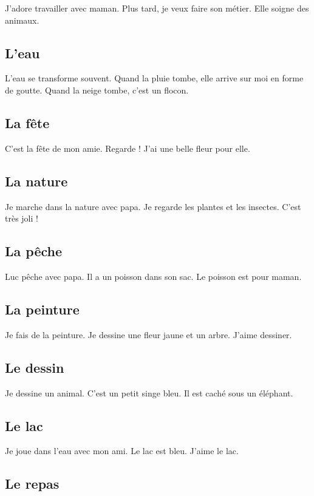 \documentclass[11pt, french]{article}
\begin{document}
J'adore travailler avec maman. Plus tard, je veux faire son métier. Elle soigne des animaux.

\subsection{L'eau}

L'eau se transforme souvent. Quand la pluie tombe, elle arrive sur moi en forme de goutte.
Quand la neige tombe, c'est un flocon.

\subsection{La fête}

C'est la fête de mon amie. Regarde ! J'ai une belle fleur pour elle.

\subsection{La nature}

Je marche dans la nature avec papa. Je regarde les plantes et les insectes. C'est très joli !

\subsection{La pêche}

Luc pêche avec papa. Il a un poisson dans son sac. Le poisson est pour maman.

\subsection{La peinture}

Je fais de la peinture. Je dessine une fleur jaune et un arbre. J'aime dessiner.

\subsection{Le dessin}

Je dessine un animal. C'est un petit singe bleu. Il est caché sous un éléphant.

\subsection{Le lac}

Je joue dans l'eau avec mon ami. Le lac est bleu. J'aime le lac.

\subsection{Le repas}
\end{document}
